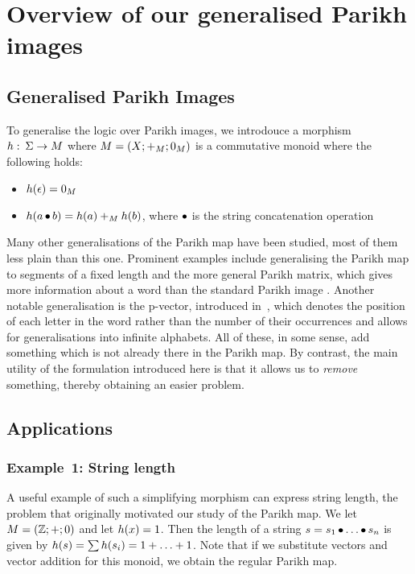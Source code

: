 \documentclass[acmsmall,review,anonymous]{acmart}\settopmatter{printfolios=true,printccs=false,printacmref=true}
\theoremstyle{definition}
\begin{document}
\section{Overview of our generalised Parikh images}

\subsection{Generalised Parikh Images}\label{sec:generalised}

To generalise the logic over Parikh images, we introdouce a morphism $h:\: \Sigma
\to M$ where $M = \left(X;+_{M};0_{M}\right)$ is a commutative monoid where the following holds:
\begin{itemize}
  \item $h(\epsilon) = 0_{M}$
  \item $h(a \operatorname{\bullet} b) = h(a) +_{M} h(b)$, where $\operatorname{\bullet}$ is
  the string concatenation operation
\end{itemize}

Many other generalisations of the Parikh map have been studied, most of them
less plain than this one. Prominent examples include generalising the Parikh map
to segments of a fixed length \cite{KARHUMAKI1980155} and the more general
Parikh matrix, which gives more information about a word than the standard
Parikh image \cite{parikh-matrix}. Another notable generalisation is the
p-vector, introduced in~\cite{infinite-words}, which denotes the position of
each letter in the word rather than the number of their occurrences and allows
for generalisations into infinite alphabets. All of these, in some sense, add
something which is not already there in the Parikh map. By contrast, the main
utility of the formulation introduced here is that it allows us to \emph{remove}
something, thereby obtaining an easier problem.

\subsection{Applications}

\subsubsection{Example~1: String length}

A useful example of such a simplifying morphism can express string length, the
problem that originally motivated our study of the Parikh map. We let $M =
\left(\mathbb{Z};+;0\right)$ and let $h(x) = 1$. Then the length of a string
$s = s_1 \operatorname{\bullet} \ldots \operatorname{\bullet}  s_n$ is given by $h(s) = \sum h(s_i) = 1
+ \ldots + 1$. Note that if we substitute vectors and vector addition for
this monoid, we obtain the regular Parikh map.
\end{document}
